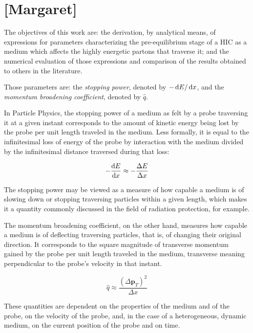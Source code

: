 \chapter{[Margaret]}
\label{sec:Margaret}


The objectives of this work are: the derivation, by analytical means, of expressions for parameters characterizing the pre-equilibrium stage of a HIC as a medium which affects the highly energetic partons that traverse it; and the numerical evaluation of those expressions and comparison of the results obtained to others in the literature.

Those parameters are: the \textit{stopping power}, denoted by $-\mathop{}\!\mathrm{d} E / \mathop{}\!\mathrm{d} x$, and the \textit{momentum broadening coefficient}, denoted by $\hat{q}$.

In Particle Physics, the stopping power of a medium as felt by a probe traversing it at a given instant  corresponds to the amount of kinetic energy being lost by the probe per unit length traveled in the medium. Less formally, it is equal to the infinitesimal loss of energy of the probe by interaction with the medium divided by the infinitesimal distance traversed during that loss:

\begin{equation*}
- \frac{\mathop{}\!\mathrm{d} E}{\mathop{}\!\mathrm{d} x} \approx - \frac{\Delta E}{\Delta x}
\end{equation*}

The stopping power may be viewed as a measure of how capable a medium is of slowing down or stopping traversing particles within a given length, which makes it a quantity commonly discussed in the field of radiation protection, for example.

The momentum broadening coefficient, on the other hand, measures how capable a medium is of deflecting traversing particles, that is, of changing their original direction. It corresponds to the square magnitude of transverse momentum gained by the probe per unit length traveled in the medium, transverse meaning perpendicular to the probe’s velocity in that instant.

\begin{equation*}
\hat{q} \approx \frac{(\Delta{\mathbf{p}_T})^2}{\Delta x}
\end{equation*}

These quantities are dependent on the properties of the medium and of the probe, on the velocity of the probe, and, in the case of a heterogeneous, dynamic medium, on the current position of the probe and on time.

